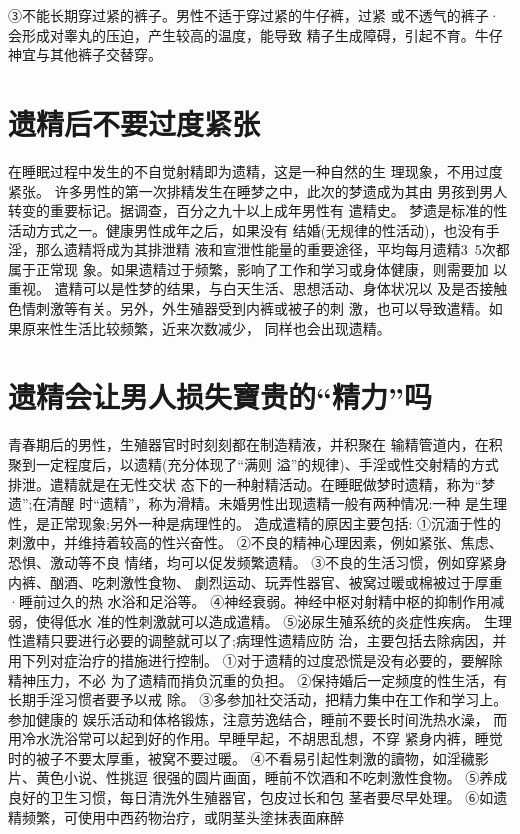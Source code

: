 \documentclass[12pt,UTF8]{ctexbook}
\begin{document}
③不能长期穿过紧的裤子。男性不适于穿过紧的牛仔裤，过紧
或不透气的裤子·会形成对睾丸的压迫，产生较高的温度，能导致
精子生成障碍，引起不育。牛仔神宜与其他裤子交替穿。


\section{遗精后不要过度紧张}

在睡眠过程中发生的不自觉射精即为遗精，这是一种自然的生
理现象，不用过度紧张。
许多男性的第一次排精发生在睡梦之中，此次的梦遗成为其由
男孩到男人转变的重要标记。据调查，百分之九十以上成年男性有
遣精史。
梦遗是标准的性活动方式之一。健康男性成年之后，如果没有
结婚(无规律的性活动)，也没有手淫，那么遗精将成为其排泄精
液和宣泄性能量的重要途径，平均每月遗精3~5次都属于正常现
象。如果遗精过于频繁，影响了工作和学习或身体健康，则需要加
以重视。
遣精可以是性梦的结果，与白天生活、思想活动、身体状况以
及是否接触色情刺激等有关。另外，外生殖器受到内裤或被子的刺
激，也可以导致遣精。如果原来性生活比较频繁，近来次数减少，
同样也会出现遗精。

\section{遗精会让男人损失寶贵的“精力”吗}

青春期后的男性，生殖器官时时刻刻都在制造精液，并积聚在
输精管道内，在积聚到一定程度后，以遗精(充分体现了“满则
溢”的规律)、手淫或性交射精的方式排泄。遣精就是在无性交状
态下的一种射精活动。在睡眠做梦时遗精，称为“梦遗”;在清醒
时“遗精”，称为滑精。未婚男性出现遗精一般有两种情况:一种
是生理性，是正常现象;另外一种是病理性的。
造成遣精的原因主要包括:
①沉湎于性的刺激中，并维持着较高的性兴奋性。
②不良的精神心理因素，例如紧张、焦虑、恐惧、激动等不良
情绪，均可以促发频繁遗精。
③不良的生活习惯，例如穿紧身内裤、酗酒、吃刺激性食物、
劇烈运动、玩弄性器官、被窝过暖或棉被过于厚重·睡前过久的热
水浴和足浴等。
④神经衰弱。神经中枢对射精中枢的抑制作用减弱，使得低水
准的性刺激就可以造成遣精。
⑤泌尿生殖系统的炎症性疾病。
生理性遣精只要进行必要的调整就可以了;病理性遗精应防
治，主要包括去除病因，并用下列对症治疗的措施进行控制。
①对于遗精的过度恐慌是没有必要的，要解除精神压力，不必
为了遗精而掯负沉重的负担。
②保持婚后一定频度的性生活，有长期手淫习惯者要予以戒
除。
③多参加社交活动，把精力集中在工作和学习上。参加健康的
娱乐活动和体格锻炼，注意劳逸结合，睡前不要长时间洗热水澡，
而用冷水洗浴常可以起到好的作用。早睡早起，不胡思乱想，不穿
紧身内裤，睡觉时的被子不要太厚重，被窝不要过暖。
④不看易引起性刺激的讀物，如淫穢影片、黄色小说、性挑逗
很强的圆片画面，睡前不饮酒和不吃刺激性食物。
⑤养成良好的卫生习惯，每日清洗外生殖器官，包皮过长和包
茎者要尽早处理。
⑥如遗精频繁，可使用中西药物治疗，或阴茎头塗抹表面麻醉
\end{document}
